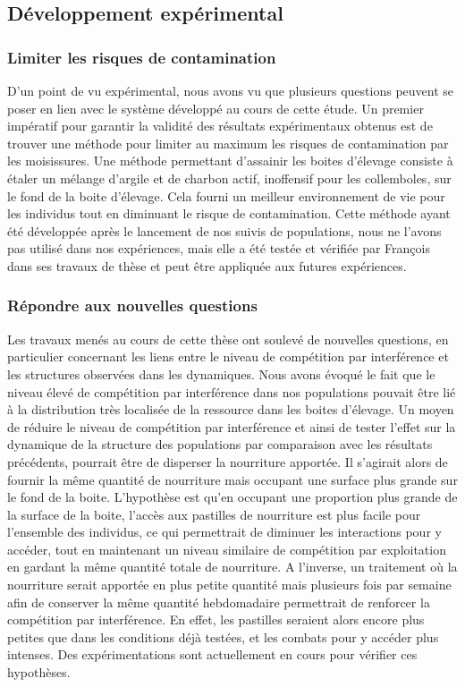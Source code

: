 \subsection{Développement expérimental}

\subsubsection{Limiter les risques de contamination}

D'un point de vu expérimental, nous avons vu que plusieurs questions peuvent se
poser en lien avec le système développé au cours de cette étude. Un premier
impératif pour garantir la validité des résultats expérimentaux obtenus est de
trouver une méthode pour limiter au maximum les risques de contamination par les
moisissures. Une méthode permettant d'assainir les boites d'élevage consiste à
étaler un mélange d'argile et de charbon actif, inoffensif pour les collemboles,
sur le fond de la boite d'élevage. Cela fourni un meilleur environnement de vie
pour les individus tout en diminuant le risque de contamination. Cette méthode
ayant été développée après le lancement de nos suivis de populations, nous ne
l'avons pas utilisé dans nos expériences, mais elle a été testée et vérifiée par
François \textcites{mallard2013b} dans ses travaux de thèse et peut être
appliquée aux futures expériences.

\subsubsection{Répondre aux nouvelles questions}

Les travaux menés au cours de cette thèse ont soulevé de nouvelles questions,
en particulier concernant les liens entre le niveau de compétition par
interférence et les structures observées dans les dynamiques. Nous avons évoqué le fait que
le niveau élevé de compétition par interférence dans nos populations pouvait
être lié à la distribution très localisée de la ressource dans les boites
d'élevage. Un moyen de réduire le niveau de compétition par interférence et
ainsi de tester l'effet sur la dynamique de la structure des populations par
comparaison avec les résultats précédents, pourrait être de disperser la
nourriture apportée. Il s'agirait alors de fournir la même quantité de
nourriture mais occupant une surface plus grande sur le fond de la boite.
L'hypothèse est qu'en occupant une proportion plus grande de la surface de
la boite, l'accès aux pastilles de nourriture est plus facile pour l'ensemble
des individus, ce qui permettrait de diminuer les interactions pour y accéder,
tout en maintenant un niveau similaire de compétition par exploitation en
gardant la même quantité totale de nourriture. A l'inverse, un traitement où la
nourriture serait apportée en plus petite quantité mais plusieurs fois par
semaine afin de conserver la même quantité hebdomadaire permettrait de renforcer
la compétition par interférence. En effet, les pastilles seraient alors encore
plus petites que dans les conditions déjà testées, et les combats pour y accéder
plus intenses. Des expérimentations sont actuellement en cours pour vérifier ces
hypothèses.


